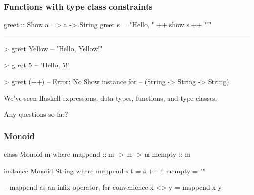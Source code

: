 \documentclass[UKenglish,usenames,dvipsnames,svgnames,table,aspectratio=169,mathserif]{beamer}
\newcommand{\textslide}[1]{{
\begin{frame}
\begin{center}

#1

\end{center}
\end{frame}
}}
\begin{document}
\begin{frame}[fragile]
\frametitle{Functions with type class constraints}
\begin{center}
\begin{minipage}{0.6\textwidth}
\begin{haskellcode}
greet :: Show a => a -> String
greet s = "Hello, " ++ show s ++ "!"

\end{haskellcode}
\pause
\hrule
\begin{haskellcode}

> greet Yellow
-- "Hello, Yellow!"
\end{haskellcode}
\pause
\begin{haskellcode}

> greet 5
-- "Hello, 5!"
\end{haskellcode}

\pause
\begin{haskellcode}

> greet (++)
-- Error: No Show instance for
--        (String -> String -> String)
\end{haskellcode}

\end{minipage}
\end{center}
\end{frame}


\textslide{
We've seen Haskell expressions, data types, functions, and type classes.
\medskip

Any questions so far?
}

\begin{frame}[fragile]
\frametitle{Monoid}
\begin{center}
\begin{minipage}{0.6\textwidth}
\begin{haskellcode}
class Monoid m where
  mappend :: m -> m -> m
  mempty  :: m
\end{haskellcode}
\pause
\begin{haskellcode}
instance Monoid String where
  mappend s t = s ++ t
  mempty = ""
\end{haskellcode}
\pause
\begin{haskellcode}
-- mappend as an infix operator, for convenience
x <> y = mappend x y
\end{haskellcode}
\end{minipage}
\end{center}
\end{frame}
\end{document}

